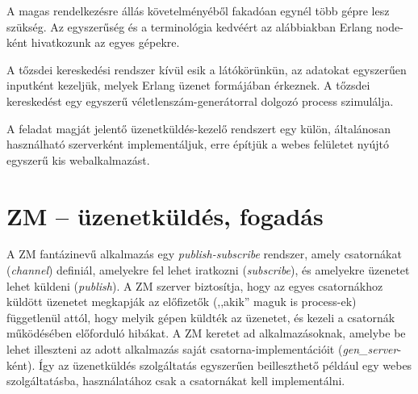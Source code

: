 \documentclass[12pt, a4paper, oneside]{book}
\begin{document}
A magas rendelkezésre állás követelményéből fakadóan egynél több gépre lesz
szükség. Az egyszerűség és a terminológia kedvéért az alábbiakban Erlang
node-ként hivatkozunk az egyes gépekre.

A tőzsdei kereskedési rendszer kívül esik a látókörünkün, az adatokat
egyszerűen inputként kezeljük, melyek Erlang üzenet formájában érkeznek. A
tőzsdei kereskedést egy egyszerű véletlenszám-generátorral dolgozó process
szimulálja.

A feladat magját jelentő üzenetküldés-kezelő rendszert egy külön, általánosan
használható szerverként implementáljuk, erre építjük a webes felületet nyújtó
egyszerű kis webalkalmazást.

\section{ZM -- üzenetküldés, fogadás}
A ZM fantázinevű alkalmazás egy \emph{publish-subscribe} rendszer, amely
csatornákat (\emph{channel}) definiál, amelyekre fel lehet iratkozni
(\emph{subscribe}), és amelyekre üzenetet lehet küldeni (\emph{publish}). A ZM
szerver biztosítja, hogy az egyes csatornákhoz küldött üzenetet megkapják az
előfizetők (,,akik'' maguk is process-ek) függetlenül attól, hogy melyik gépen
küldték az üzenetet, és kezeli a csatornák működésében előforduló hibákat. A ZM
keretet ad alkalmazásoknak, amelybe be lehet illeszteni az adott alkalmazás
saját csatorna-implementációit (\emph{gen\_server}-ként). Így az üzenetküldés
szolgáltatás egyszerűen beilleszthető például egy webes szolgáltatásba,
használatához csak a csatornákat kell implementálni.
\end{document}
